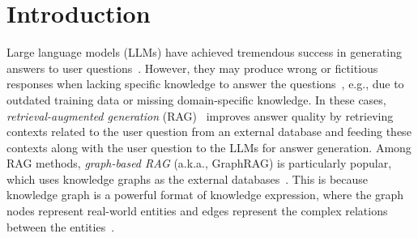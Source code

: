 \section{Introduction}

Large language models (LLMs) have achieved tremendous success in generating answers to user questions~\cite{hadi2023survey,hadi2023large,zhu2023large}. 
However, they may produce wrong or fictitious responses when lacking specific knowledge to answer the questions~\cite{wang2023survey,huang2023survey,tonmoy2024comprehensive}, e.g., due to outdated training data or missing domain-specific knowledge. 
In these cases, \textit{retrieval-augmented generation} (RAG)~\cite{lewis2020retrieval} improves answer quality by retrieving contexts related to the user question from an external database and feeding these contexts along with the user question to 
the LLMs for answer generation. Among RAG methods, \textit{graph-based RAG} (a.k.a., GraphRAG) is particularly popular, which uses knowledge graphs as the external databases~\cite{procko2024graph,he2024g,hu2024grag,zhang2024graph}.
This is because knowledge graph is a powerful format of knowledge expression, where the graph nodes represent real-world entities and edges represent the complex relations between the entities~\cite{chen2020review,fensel2020introduction}.         



